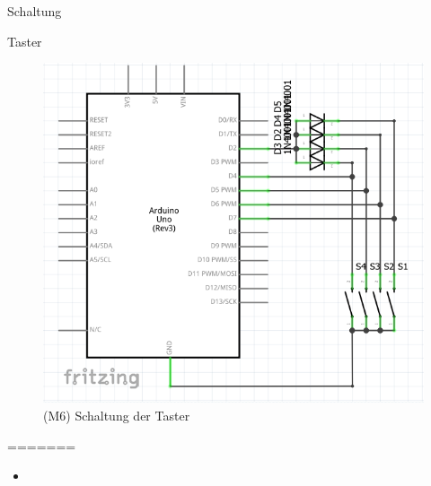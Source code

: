 \documentclass[mathserif,9pt]{article}
\begin{document}
    \begin{frame}{Schaltung}
        \begin{block}{Taster}
               \begin{figure}
                    \centering
                    \includegraphics[height=0.5\paperheight]{img/taster_schaltung.png}
                    \caption[M6]{(M6) Schaltung der Taster}
                    \label{fig:taster_schaltung}
               \end{figure}
=======
            \begin{minipage}[c]{0.6\textwidth}
                \begin{itemize}
                    \item 
                \end{itemize}
            \end{minipage}
            \hfill
            \begin{minipage}[c]{0.3\textwidth}
               \begin{figure} 

\end{figure}
\end{minipage}
\end{block}
\end{frame}
\end{document}
